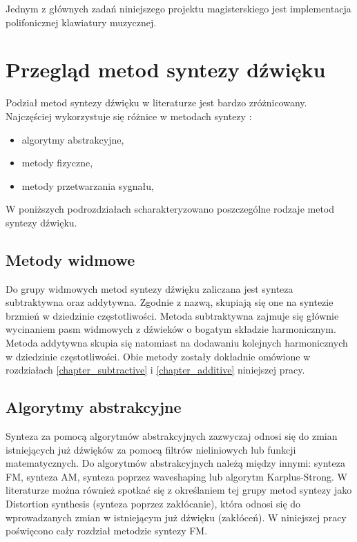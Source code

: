 %
%

Jednym z głównych zadań niniejszego projektu magisterskiego jest implementacja polifonicznej klawiatury muzycznej.



\section{Przegląd metod syntezy dźwięku}
Podział metod syntezy dźwięku w literaturze jest bardzo zróżnicowany. Najczęściej wykorzystuje się różnice w metodach syntezy \cite{metody_syntezy}:
\begin{itemize}
	\item algorytmy abstrakcyjne,
	\item metody fizyczne,
	\item metody przetwarzania sygnału,
\end{itemize}

W poniższych podrozdziałach scharakteryzowano poszczególne rodzaje metod syntezy dźwięku.

\subsection{Metody widmowe}
Do grupy widmowych metod syntezy dźwięku zaliczana jest synteza subtraktywna oraz addytywna. Zgodnie z nazwą, skupiają się one na syntezie brzmień w dziedzinie częstotliwości. Metoda subtraktywna zajmuje się głównie wycinaniem pasm widmowych z dźwieków o bogatym składzie harmonicznym. Metoda addytywna skupia się natomiast na dodawaniu kolejnych harmonicznych w dziedzinie częstotliwości. Obie metody zostały dokładnie omówione w rozdziałach \ref{chapter_subtractive} i \ref{chapter_additive} niniejszej pracy.

\subsection{Algorytmy abstrakcyjne}
Synteza za pomocą algorytmów abstrakcyjnych zazwyczaj odnosi się do zmian istniejących już dźwięków za pomocą filtrów nieliniowych lub funkcji matematycznych. Do algorytmów abstrakcyjnych należą między innymi: synteza FM, synteza AM, synteza poprzez waveshaping lub algorytm Karplus-Strong. W literaturze można również spotkać się z określaniem tej grupy metod syntezy jako Distortion synthesis (synteza poprzez zakłócanie), która odnosi się do wprowadzanych zmian w istniejącym już dźwięku (zakłóceń). W niniejszej pracy poświęcono cały rozdział metodzie syntezy FM.

